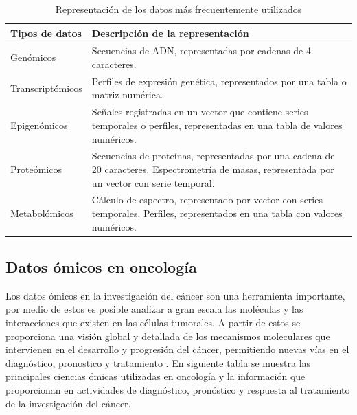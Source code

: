 \begin{table}[!h]
    \scriptsize
    \centering
    \caption{Representación de los datos más frecuentemente utilizados}
    
    \begin{tabular}{
    >{\centering\arraybackslash}m{4cm} 
    >{\centering\arraybackslash}m{9cm}}
\hline 
        \textbf{Tipos de datos} & 
        \textbf{Descripción de la representación} 
\\      
    \hline \hline 

    Genómicos &
    Secuencias de ADN, representadas por cadenas de 4 caracteres.
\\
    \hline
    Transcriptómicos &
    Perfiles de expresión genética, representados por una tabla o matriz numérica.
\\
    \hline
    Epigenómicos &
    Señales registradas en un vector que contiene series temporales o perfiles, representadas en una tabla de valores numéricos.
\\
    \hline
     Proteómicos &
     Secuencias de proteínas, representadas por una cadena de 20 caracteres. Espectrometría de masas, representada por un vector con serie temporal.
\\
     \hline
     Metabolómicos &
     Cálculo de espectro, representado por vector con series temporales.
     Perfiles, representados en una tabla con valores numéricos.
\\
    
\hline
    \end{tabular}
    \label{tab:Datos_cod}
\end{table}

\subsection{Datos ómicos en oncología}

Los datos ómicos en la investigación del cáncer son una herramienta importante, por medio de estos es posible analizar a gran escala las moléculas y las interacciones que existen en las células tumorales. A partir de estos se proporciona una visión global y detallada de los mecanismos moleculares que intervienen en el desarrollo y progresión del cáncer, permitiendo nuevas vías en el diagnóstico, pronostico y tratamiento \citep{olivier2019need}. En siguiente tabla se muestra las principales ciencias ómicas utilizadas en oncología y la información que proporcionan en actividades de diagnóstico, pronóstico y respuesta al tratamiento de la investigación del cáncer.

